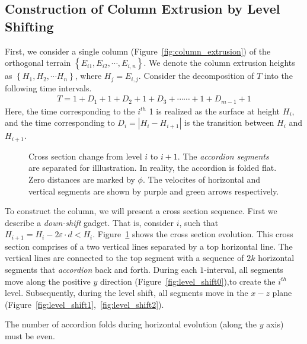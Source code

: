 \subsection{Construction of Column Extrusion by Level Shifting}
\label{sec:column_extrusion}

First, we consider a single column (Figure~\ref{fig:column_extrusion})
of the orthogonal terrain $\left\{ E_{i1}, E_{i2}, \cdots, E_{i,n} \right\}$.
We denote the column extrusion heights as $\left\{ H_1, H_2,\cdots H_n \right\}$, where $H_j = E_{i,j}$.
Consider the decomposition of $T$ into the following time intervals.%
\begin{align}
    \label{eq:column_decomposition}
T = 1 + D_1  +  1 + D_2  +  1 + D_3  +\cdots\cdots +  1 + D_{m-1}  +  1
\end{align}
Here, the time corresponding to the $i^{th}$ 1 is realized as the surface at height $H_i$,
and the time corresponding to $D_i = \left| H_i-H_{i+1}\right|$ is the transition between $H_i$ and $H_{i+1}$.

\graphicspath{{./figures/}}
\begin{figure}[htb]
    \def\svgwidth{1.0\textwidth}
    \caption{
    Cross section change from level $i$ to $i+1$. The \emph{accordion segments} are separated for illlustration.
    In reality, the accordion is folded flat. Zero distances are marked by $\phi$.
    The velocites of horizontal and vertical segments are shown by purple and green arrows respectively.
    }
    \label{fig:level_shift_layers}
\end{figure}

%

To construct the column, we will present a cross section sequence. First we describe a \emph{down-shift} gadget.
That is, consider $i$, such that $H_{i+1} = H_i-2\varepsilon\cdot d < H_i$.
Figure~\ref{fig:level_shift_layers} shows the cross section evolution.
This cross section comprises of a two vertical lines separated by a top horizontal line.
The vertical lines are connected to the top segment with
a sequence of $2k$ horizontal segments that \emph{accordion} back and forth.
During each $1$-interval, all segments move along the positive $y$ direction (Figure~\ref{fig:level_shift0}),to create the $i^{th}$ level.
Subsequently, during the level shift, all segments move in the $x-z$ plane (Figure~\ref{fig:level_shift1},~\ref{fig:level_shift2}).
\begin{property}
\label{pro:accordion_even}
The number of accordion folds during horizontal evolution (along the $y$ axis) must be even.
\end{property}

